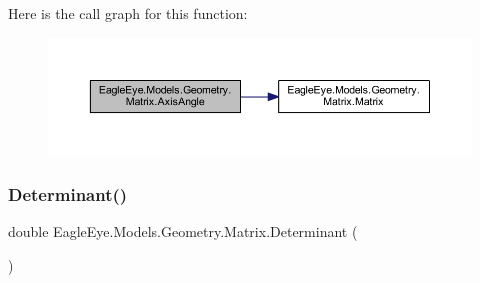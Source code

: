 Here is the call graph for this function\+:\nopagebreak
\begin{figure}[H]
\begin{center}
\leavevmode
\includegraphics[width=350pt]{class_eagle_eye_1_1_models_1_1_geometry_1_1_matrix_af76e4c9c86e25fab681c2f7a652541c4_cgraph}
\end{center}
\end{figure}
\mbox{\label{class_eagle_eye_1_1_models_1_1_geometry_1_1_matrix_a29981530fa3c9397a2b7daf39548647b}} 
\subsubsection{\texorpdfstring{Determinant()}{Determinant()}}
{\footnotesize\ttfamily double Eagle\+Eye.\+Models.\+Geometry.\+Matrix.\+Determinant (\begin{DoxyParamCaption}{ }\end{DoxyParamCaption})}

